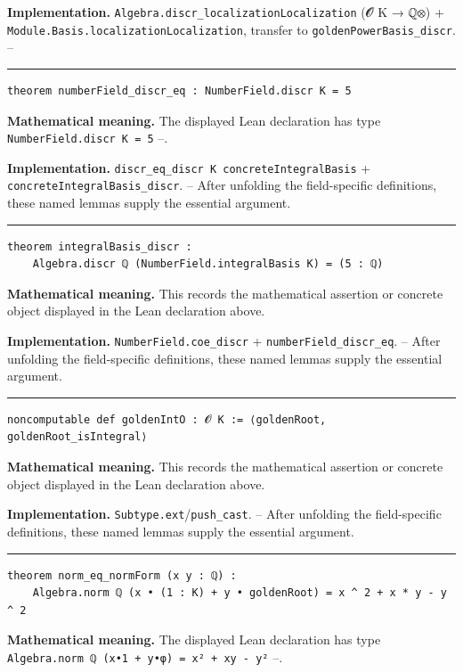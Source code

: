 \documentclass[UTF8,a4paper,11pt,fontset=fandol]{ctexart}
\theoremstyle{definition}
\newcommand{\statementsep}{\par\medskip\hrule\medskip}
\begin{document}
\noindent\textbf{Implementation.} \texttt{Algebra.\allowbreak{}discr\_\allowbreak{}localizationLocalization} (𝓞 K → ℚ⊗) + \texttt{Module.\allowbreak{}Basis.\allowbreak{}localizationLocalization}, transfer to \texttt{goldenPowerBasis\_\allowbreak{}discr}. --\par
\statementsep
\begin{verbatim}
theorem numberField_discr_eq : NumberField.discr K = 5
\end{verbatim}
\noindent\textbf{Mathematical meaning.} The displayed Lean declaration has type \texttt{NumberField.\allowbreak{}discr K = 5} --.\par
\noindent\textbf{Implementation.} \texttt{discr\_\allowbreak{}eq\_\allowbreak{}discr K concreteIntegralBasis} + \texttt{concreteIntegralBasis\_\allowbreak{}discr}. -- After unfolding the field-specific definitions, these named lemmas supply the essential argument.\par
\statementsep
\begin{verbatim}
theorem integralBasis_discr :
    Algebra.discr ℚ (NumberField.integralBasis K) = (5 : ℚ)
\end{verbatim}
\noindent\textbf{Mathematical meaning.} This records the mathematical assertion or concrete object displayed in the Lean declaration above.\par
\noindent\textbf{Implementation.} \texttt{NumberField.\allowbreak{}coe\_\allowbreak{}discr} + \texttt{numberField\_\allowbreak{}discr\_\allowbreak{}eq}. -- After unfolding the field-specific definitions, these named lemmas supply the essential argument.\par
\statementsep
\begin{verbatim}
noncomputable def goldenIntO : 𝓞 K := ⟨goldenRoot, goldenRoot_isIntegral⟩
\end{verbatim}
\noindent\textbf{Mathematical meaning.} This records the mathematical assertion or concrete object displayed in the Lean declaration above.\par
\noindent\textbf{Implementation.} \texttt{Subtype.\allowbreak{}ext}/\texttt{push\_\allowbreak{}cast}. -- After unfolding the field-specific definitions, these named lemmas supply the essential argument.\par
\statementsep
\begin{verbatim}
theorem norm_eq_normForm (x y : ℚ) :
    Algebra.norm ℚ (x • (1 : K) + y • goldenRoot) = x ^ 2 + x * y - y ^ 2
\end{verbatim}
\noindent\textbf{Mathematical meaning.} The displayed Lean declaration has type \texttt{Algebra.\allowbreak{}norm ℚ (x•1 + y•φ) = x² + xy - y²} --.\par
\end{document}
